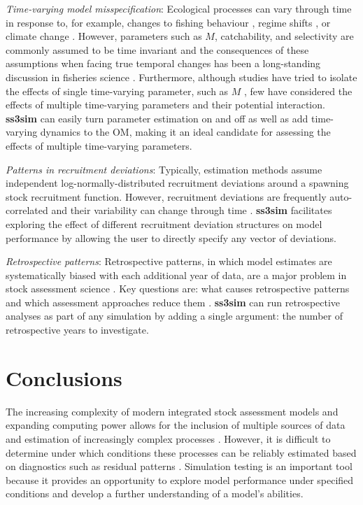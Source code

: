 \emph{Time-varying model misspecification}: Ecological processes can vary
through time in response to, for example, changes to fishing behaviour
\cite{hilborn1992}, regime shifts \cite{vert-pre2013}, or climate change
\cite{walther2002}. However, parameters such as $M$, catchability, and
selectivity are commonly assumed to be time invariant and the consequences of
these assumptions when facing true temporal changes has been a long-standing
discussion in fisheries science \cite{royama1992, wilberg2006, fu2001}.
Furthermore, although studies have tried to isolate the effects of single
time-varying parameter, such as $M$ \cite{lee2011, jiao2012, deroba2013,
  johnson2014}, few have considered the effects of multiple time-varying
parameters and their potential interaction. \textbf{ss3sim} can easily turn
parameter estimation on and off as well as add time-varying dynamics to the OM,
making it an ideal candidate for assessing the effects of multiple time-varying
parameters.

\emph{Patterns in recruitment deviations}: Typically, estimation methods assume
independent log-normally-distributed recruitment deviations around a spawning
stock recruitment function. However, recruitment deviations are frequently
auto-correlated and their variability can change through time
\cite{beamish1995, pyper1998}. \textbf{ss3sim} facilitates exploring the
effect of different recruitment deviation structures on model performance by
allowing the user to directly specify any vector of deviations.

\emph{Retrospective patterns}: Retrospective patterns, in which model estimates
are systematically biased with each additional year of data, are a major
problem in stock assessment science \cite{mohn1999, legault2008}. Key questions
are: what causes retrospective patterns and which assessment approaches reduce
them \cite{legault2008}. \textbf{ss3sim} can run retrospective analyses as part
of any simulation by adding a single argument: the number of retrospective
years to investigate.

\section*{Conclusions}

The increasing complexity of modern integrated stock assessment models and
expanding computing power allows for the inclusion of multiple sources of data
and estimation of increasingly complex processes \cite{maunder2013}. However,
it is difficult to determine under which conditions these processes can be
reliably estimated based on diagnostics such as residual patterns
\cite{maunder2013}. Simulation testing is an important tool because it provides
an opportunity to explore model performance under specified conditions and
develop a further understanding of a model's abilities.

